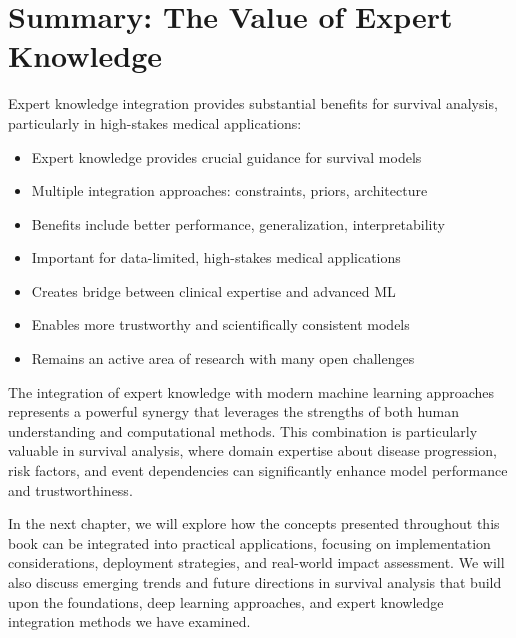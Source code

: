 \section{Summary: The Value of Expert Knowledge}

Expert knowledge integration provides substantial benefits for survival analysis, particularly in high-stakes medical applications:

\begin{itemize}
    \item Expert knowledge provides crucial guidance for survival models
    \item Multiple integration approaches: constraints, priors, architecture
    \item Benefits include better performance, generalization, interpretability
    \item Important for data-limited, high-stakes medical applications
    \item Creates bridge between clinical expertise and advanced ML
    \item Enables more trustworthy and scientifically consistent models
    \item Remains an active area of research with many open challenges
\end{itemize}

The integration of expert knowledge with modern machine learning approaches represents a powerful synergy that leverages the strengths of both human understanding and computational methods. This combination is particularly valuable in survival analysis, where domain expertise about disease progression, risk factors, and event dependencies can significantly enhance model performance and trustworthiness.

\begin{notebox}[title=Looking Ahead]
In the next chapter, we will explore how the concepts presented throughout this book can be integrated into practical applications, focusing on implementation considerations, deployment strategies, and real-world impact assessment. We will also discuss emerging trends and future directions in survival analysis that build upon the foundations, deep learning approaches, and expert knowledge integration methods we have examined.
\end{notebox}
